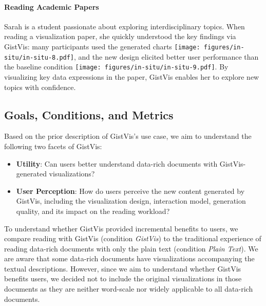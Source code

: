 \paragraph{Reading Academic Papers}
Sarah is a student passionate about exploring interdisciplinary topics. When reading a visualization paper, she quickly understood the key findings via GistVis: many participants used the generated charts \texttt{[image: figures/in-situ/in-situ-8.pdf]}, and the new design elicited better user performance than the baseline condition \texttt{[image: figures/in-situ/in-situ-9.pdf]}. By visualizing key data expressions in the paper, GistVis enables her to explore new topics with confidence.


\subsection{Goals, Conditions, and Metrics}
Based on the prior description of GistVis's use case, we aim to understand the following two facets of GistVis:
\begin{itemize}
    \item \textbf{Utility}: Can users better understand data-rich documents with GistVis-generated visualizations?
    \item \textbf{User Perception}: How do users perceive the new content generated by GistVis, including the visualization design, interaction model, generation quality, and its impact on the reading workload?
\end{itemize}

To understand whether GistVis provided incremental benefits to users, we compare reading with GistVis (condition \textit{GistVis}) to the traditional experience of reading data-rich documents with only the plain text (condition \textit{Plain Text}). We are aware that some data-rich documents have visualizations accompanying the textual descriptions. However, since we aim to understand whether GistVis benefits users, we decided not to include the original visualizations in those documents as they are neither word-scale nor widely applicable to all data-rich documents.

